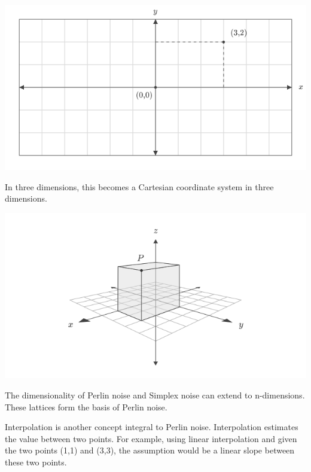 \documentclass[10pt]{report}
\begin{document}
		\begin{minipage}{\textwidth}
			\centering
			\includegraphics[scale=.35]{2d}
			\label{fig:2d}
		\end{minipage}
	
		In three dimensions, this becomes a Cartesian coordinate system in three dimensions.
		
		\begin{minipage}{\textwidth}
			\centering
			\includegraphics[scale=.5]{3d}
			\label{fig:3d}
		\end{minipage}
	
		The dimensionality of Perlin noise and Simplex noise can extend to n-dimensions. These lattices form the basis of Perlin noise.
		
		Interpolation is another concept integral to Perlin noise. Interpolation estimates the value between two points. For example, using linear interpolation and given the two points (1,1) and (3,3), the assumption would be a linear slope between these two points. 
		
\end{document}
